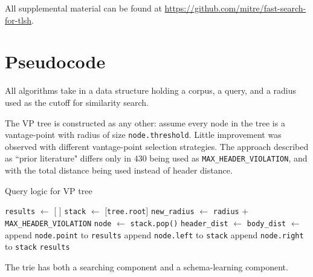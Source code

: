 \documentclass[5p,final]{elsarticle}
\newcommand{\supplementalsurl}{\url{https://github.com/mitre/fast-search-for-tlsh}}
\begin{document}
All supplemental material can be found at \supplementalsurl.

\section{Pseudocode}\label{Pseudocode}

All algorithms take in a data structure holding a corpus, a query, and a
radius used as the cutoff for similarity search.

The VP tree is constructed as any other: assume every node in the
tree is a vantage-point with radius of size \texttt{node.threshold}.
Little improvement was observed with different vantage-point selection
strategies. The approach described as ``prior literature" differs
only in $430$ being used as \texttt{MAX_HEADER_VIOLATION}, and with
the total distance being used instead of header distance.

\begin{algorithm}[H]
	\caption{Query logic for VP tree}
	\begin{algorithmic}
		\State \texttt{results} $\gets$ [ ]
		\State \texttt{stack} $\gets$ [\texttt{tree.root}]
		\State \texttt{new\_radius} $\gets$ \texttt{radius} +
		\texttt{MAX\_HEADER\_VIOLATION}
		\State \texttt{node} $\gets$ \texttt{stack.pop()}
		\State \texttt{header\_dist} $\gets$
		\State \texttt{body\_dist} $\gets$
		\State append \texttt{node.point} to \texttt{results}
		\EndIf
		\State append \texttt{node.left} to \texttt{stack}
		\EndIf
		\State append \texttt{node.right} to \texttt{stack}
		\EndIf
		\EndWhile
		\State \Return \texttt{results}
		\EndFunction
	\end{algorithmic}
\end{algorithm}

The trie has both a searching component and a schema-learning component.
\end{document}
